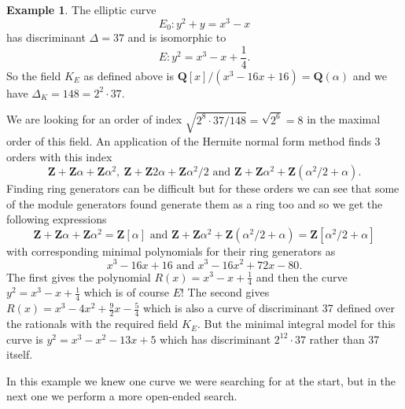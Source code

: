 \documentclass[12pt,a4paper,abstracton,bibtotoc]{scrreprt}
\theoremstyle{definition}
\newtheorem{ex}{Example}
\newcommand{\QQ}{\mathbf{Q}}
\newcommand{\ZZ}{\mathbf{Z}}
\begin{document}
\begin{ex}
The elliptic curve
\[
E_0\colon y^2 + y = x^3 - x
\]
has discriminant $\Delta = 37$ and is isomorphic to
\[
E\colon y^2 = x^3 - x + \frac{1}{4}.
\]
So the field $K_E$ as defined above is $\QQ[x]/(x^3 - 16x + 16) = \QQ(\alpha)$ and we have $\Delta_K = 148 = 2^2 \cdot 37$.

We are looking for an order of index $\sqrt{2^8\cdot 37/148} = \sqrt{2^6} = 8$ in the maximal order of this field.
An application of the Hermite normal form method finds 3 orders with this index
\[
\ZZ + \ZZ\alpha + \ZZ\alpha^2,\ \ZZ + \ZZ2\alpha + \ZZ\alpha^2/2\text{ and } \ZZ + \ZZ\alpha^2 + \ZZ(\alpha^2/2 + \alpha).
\]
Finding ring generators can be difficult but for these orders we can see that some of the module generators found generate them as a ring too and so we get the following expressions
\[
\ZZ + \ZZ\alpha + \ZZ\alpha^2 = \ZZ[\alpha]\text{ and } \ZZ + \ZZ\alpha^2 + \ZZ(\alpha^2/2 + \alpha) = \ZZ[\alpha^2/2 + \alpha]
\]
with corresponding minimal polynomials for their ring generators as
\[
x^3 -16x + 16\text{ and }x^3 - 16x^2 + 72x - 80.
\]
The first gives the polynomial $R(x) = x^3 - x + \frac{1}{4}$ and then the curve $y^2 =  x^3 - x + \frac{1}{4}$ which is of course $E$!
The second gives $R(x) = x^3 -4x^2 + \frac{9}{2}x -\frac{5}{4}$ which is also a curve of discriminant 37 defined over the rationals with the required field $K_E$.
But the minimal integral model for this curve is $y^2 = x^3 - x^2 - 13x + 5$ which has discriminant $2^12\cdot 37$ rather than 37 itself.
\end{ex}

In this example we knew one curve we were searching for at the start, but in the next one we perform a more open-ended search.
\end{document}
